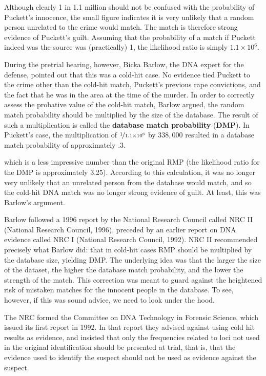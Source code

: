 \documentclass[
  10pt,
  dvipsnames,enabledeprecatedfontcommands]{scrartcl}
\begin{document}
Although clearly 1 in 1.1 million should not be confused with the
probability of Puckett's innocence, the small figure indicates it is
very unlikely that a random person unrelated to the crime would match.
The match is therefore strong evidence of Puckett's guilt. Assuming that
the probability of a match if Puckett indeed was the source was
(practically) 1, the likelihood ratio is simply \(1.1 \times 10^6\).

During the pretrial hearing, however, Bicka Barlow, the DNA expert for
the defense, pointed out that this was a cold-hit case. No evidence tied
Puckett to the crime other than the cold-hit match, Puckett's previous
rape convictions, and the fact that he was in the area at the time of
the murder. In order to correctly assess the probative value of the
cold-hit match, Barlow argued, the random match probability should be
multiplied by the size of the database. The result of such a
multiplication is called the \textbf{database match probability}
(\textbf{DMP}). In Puckett's case, the multiplication of
\(\nicefrac{1}{1.1\times 10^6}\) by \(338,000\) resulted in a database
match probability of approximately .3.

\noindent which is a less impressive number than the original RMP (the
likelihood ratio for the DMP is approximately 3.25). According to this
calculation, it was no longer very unlikely that an unrelated person
from the database would match, and so the cold-hit DNA match was no
longer strong evidence of guilt. At least, this was Barlow's argument.

Barlow followed a 1996 report by the National Research Council called
NRC II (National Research Council, 1996), preceded by an earlier report
on DNA evidence called NRC I (National Research Council, 1992). NRC II
recommended precisely what Barlow did: that in cold-hit cases RMP should
be multiplied by the database size, yielding DMP. The underlying idea
was that the larger the size of the dataset, the higher the database
match probability, and the lower the strength of the match. This
correction was meant to guard against the heightened risk of mistaken
matches for the innocent people in the database. To see, however, if
this was sound advice, we need to look under the hood.

The NRC formed the Committee on DNA Technology in Forensic Science,
which issued its first report in 1992. In that report they advised
against using cold hit results as evidence, and insisted that only the
frequencies related to loci not used in the original identification
should be presented at trial, that is, that the evidence used to
identify the suspect should not be used as evidence against the suspect.
\end{document}
